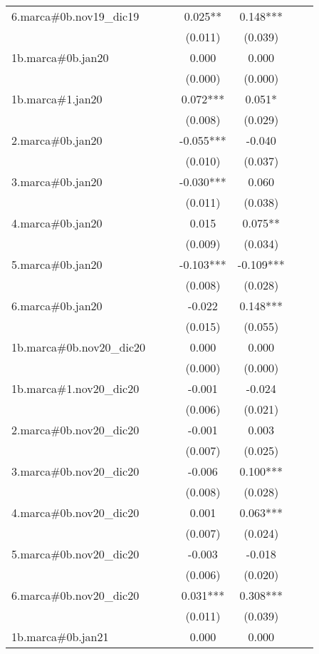 \begin{tabular}{lcccccc}
6.marca\#0b.nov19\_dic19 &  &  & 0.025** & 0.148*** &  &  \\
 &  &  & (0.011) & (0.039) &  &  \\
1b.marca\#0b.jan20 &  &  & 0.000 & 0.000 &  &  \\
 &  &  & (0.000) & (0.000) &  &  \\
1b.marca\#1.jan20 &  &  & 0.072*** & 0.051* &  &  \\
 &  &  & (0.008) & (0.029) &  &  \\
2.marca\#0b.jan20 &  &  & -0.055*** & -0.040 &  &  \\
 &  &  & (0.010) & (0.037) &  &  \\
3.marca\#0b.jan20 &  &  & -0.030*** & 0.060 &  &  \\
 &  &  & (0.011) & (0.038) &  &  \\
4.marca\#0b.jan20 &  &  & 0.015 & 0.075** &  &  \\
 &  &  & (0.009) & (0.034) &  &  \\
5.marca\#0b.jan20 &  &  & -0.103*** & -0.109*** &  &  \\
 &  &  & (0.008) & (0.028) &  &  \\
6.marca\#0b.jan20 &  &  & -0.022 & 0.148*** &  &  \\
 &  &  & (0.015) & (0.055) &  &  \\
1b.marca\#0b.nov20\_dic20 &  &  & 0.000 & 0.000 &  &  \\
 &  &  & (0.000) & (0.000) &  &  \\
1b.marca\#1.nov20\_dic20 &  &  & -0.001 & -0.024 &  &  \\
 &  &  & (0.006) & (0.021) &  &  \\
2.marca\#0b.nov20\_dic20 &  &  & -0.001 & 0.003 &  &  \\
 &  &  & (0.007) & (0.025) &  &  \\
3.marca\#0b.nov20\_dic20 &  &  & -0.006 & 0.100*** &  &  \\
 &  &  & (0.008) & (0.028) &  &  \\
4.marca\#0b.nov20\_dic20 &  &  & 0.001 & 0.063*** &  &  \\
 &  &  & (0.007) & (0.024) &  &  \\
5.marca\#0b.nov20\_dic20 &  &  & -0.003 & -0.018 &  &  \\
 &  &  & (0.006) & (0.020) &  &  \\
6.marca\#0b.nov20\_dic20 &  &  & 0.031*** & 0.308*** &  &  \\
 &  &  & (0.011) & (0.039) &  &  \\
1b.marca\#0b.jan21 &  &  & 0.000 & 0.000 &  &  \\

\end{tabular}
